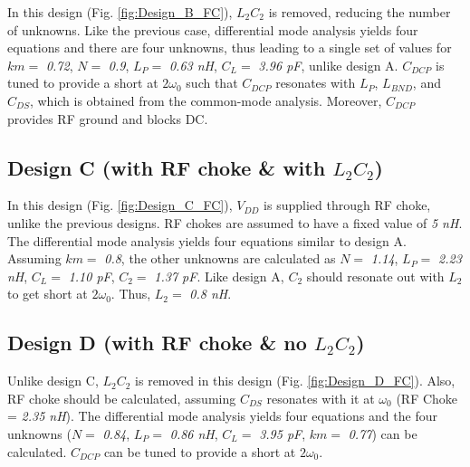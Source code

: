 \documentclass[conference]{IEEEtran}
\begin{document}
In this design (Fig. \ref{fig:Design_B_FC}), $L_2C_2$ is removed, reducing the number of unknowns. Like the previous case, differential mode analysis yields four equations and there are four unknowns, thus leading to a single set of values for $km =$ \textit{0.72}, $N =$ \textit{0.9}, $L_P =$ \textit{0.63 nH}, $C_L =$ \textit{3.96 pF}, unlike design A. $C_{DCP}$ is tuned to provide a short at $2\omega_0$ such that $C_{DCP}$ resonates with $L_P$, $L_{BND}$, and $C_{DS}$, which is obtained from the common-mode analysis. Moreover, $C_{DCP}$ provides RF ground and blocks DC.

\subsection{Design C (with RF choke \& with $L_2C_2$)}
In this design (Fig. \ref{fig:Design_C_FC}), $V_{DD}$ is supplied through RF choke, unlike the previous designs. RF chokes are assumed to have a fixed value of \textit{5 nH}. The differential mode analysis yields four equations similar to design A. Assuming $km =$ \textit{0.8}, the other unknowns are calculated as $N =$ \textit{1.14}, $L_P =$ \textit{2.23 nH}, $C_L =$ \textit{1.10 pF}, $C_2 =$ \textit{1.37 pF}.
Like design A, $C_2$ should resonate out with $L_2$ to get short at $2\omega_0$. Thus, $L_2 =$ \textit{0.8 nH}. 

\subsection{Design D (with RF choke \& no $L_2C_2$)}
 Unlike design C, $L_2C_2$ is removed in this design (Fig. \ref{fig:Design_D_FC}). Also, RF choke should be calculated, assuming $C_{DS}$ resonates with it at $\omega_0$ (RF Choke = \textit{2.35 nH}).
The differential mode analysis yields four equations and the four unknowns ($N =$ \textit{0.84}, $L_P =$ \textit{0.86 nH}, $C_L =$ \textit{3.95 pF}, $km =$ \textit{0.77}) can be calculated.
$C_{DCP}$ can be tuned to provide a short at $2\omega_0$.
\end{document}
